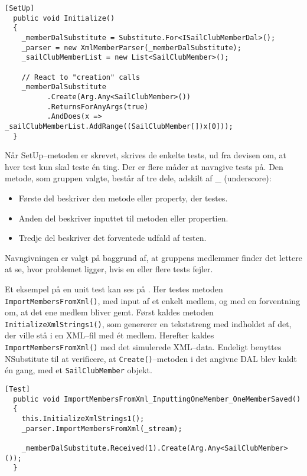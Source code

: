 \newpage

\begin{lstlisting}[frame=single, caption=Eksempel på Unit test SetUp, label=unit_test_setup]
  [SetUp]
  public void Initialize()
  {
    _memberDalSubstitute = Substitute.For<ISailClubMemberDal>();
    _parser = new XmlMemberParser(_memberDalSubstitute);
    _sailClubMemberList = new List<SailClubMember>();
    
    // React to "creation" calls
    _memberDalSubstitute
          .Create(Arg.Any<SailClubMember>())
          .ReturnsForAnyArgs(true)
          .AndDoes(x => _sailClubMemberList.AddRange((SailClubMember[])x[0]));
  }
\end{lstlisting}

Når SetUp--metoden er skrevet, skrives de enkelte tests, ud fra devisen om, at hver test kun skal teste én ting.
Der er flere måder at navngive tests på.
Den metode, som gruppen valgte, består af tre dele, adskilt af \_ (underscore):

\begin{itemize}
  \item Første del beskriver den metode eller property, der testes.
  \item Anden del beskriver inputtet til metoden eller propertien.
  \item Tredje del beskriver det forventede udfald af testen.
\end{itemize}

Navngivningen er valgt på baggrund af, at gruppens medlemmer finder det lettere at se, hvor problemet ligger, hvis en eller flere tests fejler.

Et eksempel på en unit test kan ses på .
Her testes metoden \texttt{ImportMembersFromXml()}, med input af et enkelt medlem, og med en forventning om, at det ene medlem bliver gemt.
Først kaldes metoden \texttt{InitializeXmlStrings1()}, som genererer en tekststreng med indholdet af det, der ville stå i en XML--fil med ét medlem.
Herefter kaldes \texttt{ImportMembersFromXml()} med det simulerede XML--data.
Endeligt benyttes NSubstitute til at verificere, at \texttt{Create()}--metoden i det angivne \ac{DAL} blev kaldt én gang, med et \texttt{SailClubMember} objekt.


\begin{lstlisting}[frame=single, caption=Eksempel på Unit test, label=unit_test]
  [Test]
  public void ImportMembersFromXml_InputtingOneMember_OneMemberSaved()
  {
    this.InitializeXmlStrings1();
    _parser.ImportMembersFromXml(_stream);
    
    _memberDalSubstitute.Received(1).Create(Arg.Any<SailClubMember>());
  }
\end{lstlisting}

